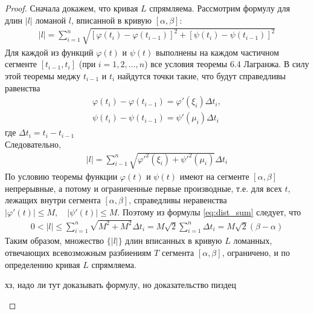 \documentclass[10pt]{article}
\begin{document}
    \begin{proof}
        Сначала докажем, что кривая $L$ спрямляема. Рассмотрим формулу для длин $|l|$ ломаной $l$, вписанной в кривую $[\alpha, \beta]$:
        \begin{gather*}
            |l| = \sum_{i = 1}^n \sqrt{[\varphi(t_i) - \varphi(t_{i-1})]^2 + [\psi(t_i) - \psi(t_{i-1})]^2}
        \end{gather*}
        Для каждой из функций $\varphi(t)$ и $\psi(t)$ выполнены на каждом частичном сегменте $[t_{i-1}, t_i]$ (при $i=1, 2, \ldots, n$) все условия теоремы 6.4 Лагранжа. В силу этой теоремы меджу $t_{i-1}$ и $t_i$ найдутся точки такие, что будут справедливы равенства
        \begin{gather*}
            \varphi(t_i) - \varphi(t_{i-1}) = \varphi'(\xi_i) \Delta t_i,\\
            \psi(t_i) - \psi(t_{i-1}) = \psi'(\mu_i) \Delta t_i
        \end{gather*}
        где $\Delta t_i = t_i - t_{i-1}$\\
        Следовательно,
        \begin{gather}
            |l| = \sum_{i-1}^n \sqrt{\varphi'^2(\xi_i) + \psi'^2(\mu_i)} \Delta t_i \label{eq:dist_sum}
        \end{gather}
        По условию теоремы функции $\varphi(t)$ и $\psi(t)$ имеют на сегменте $[\alpha, \beta]$ непрерывные, а потому и ограниченные первые производные, т.е. для всех $t$, лежащих внутри сегмента $[\alpha, \beta]$, справедливы неравенства $|\varphi'(t)| \leq M, \quad |\psi'(t)| \leq M$. Поэтому из формулы \ref{eq:dist_sum} следует, что
        \begin{gather*}
            0 < |l| \leq \sum_{i = 1}^n \sqrt{M^2 + M^2} \Delta t_i = M \sqrt{2} \sum_{i = 1}^n \Delta t_i = M \sqrt{2} (\beta - \alpha)
        \end{gather*}
        Таким образом, множество $\{|l|\}$ длин вписанных в кривую $L$ ломанных, отвечающих всевозможным разбиениям $T$ сегмента $[\alpha, \beta]$, ограничено, и по определению кривая $L$ спрямляема.
        \begin{remark}
            хз, надо ли тут доказывать формулу, но доказательство пиздец
        \end{remark}
    \end{proof}


    
\end{document}
